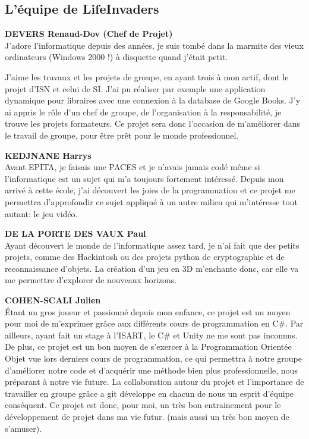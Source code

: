 \documentclass[french, 12pt]{article}
\begin{document}
\subsection{L'équipe de LifeInvaders}
\textbf{DEVERS Renaud-Dov (Chef de Projet)} \\
J'adore l'informatique depuis des années, je suis tombé dans la marmite des vieux ordinateurs (Windows 2000 !) à disquette quand j'était petit.

J'aime les travaux et les projets de groupe, en ayant trois à mon actif, dont le projet d'ISN et celui de SI. J'ai pu réaliser par exemple une application dynamique pour libraires avec une connexion à la database de Google Books.
J'y ai appris le rôle d'un chef de groupe, de l'organisation à la responsabilité, je trouve les projets formateurs.
Ce projet sera donc l'occasion de m'améliorer dans le travail de groupe, pour être prêt pour le monde professionnel.
\newline

\textbf{KEDJNANE Harrys} \\
Avant EPITA, je faisais une PACES et je n’avais jamais codé 
même si l’informatique est un sujet qui m’a toujours fortement intéressé. 
Depuis mon arrivé à cette école, j’ai découvert les joies de la programmation 
et ce projet me permettra d’approfondir ce sujet appliqué à un autre milieu 
qui m’intéresse tout autant: le jeu vidéo. 
\newline

\textbf{DE LA PORTE DES VAUX Paul} \\
Ayant découvert le monde de l’informatique assez tard, je n’ai fait que des petits projets, comme des Hackintosh ou des projets python de cryptographie et de reconnaissance d’objets.
La création d’un jeu en 3D m’enchante donc, car elle va me permettre d’explorer de nouveaux horizons.
\newline

\textbf{COHEN-SCALI Julien} \\
Étant un gros joueur et passionné depuis mon enfance, ce projet est un moyen pour moi de m’exprimer grâce aux différents cours de programmation en C\#.
Par ailleurs, ayant fait un stage à l’ISART, le C\# et Unity ne me sont pas inconnus. De plus, ce projet est un bon moyen de s’exercer à la Programmation Orientée Objet vue lors derniers cours de programmation,
ce qui permettra à notre groupe d’améliorer notre code et d’acquérir une méthode bien plus professionnelle, nous préparant à notre vie future.
La collaboration autour du projet et l’importance de travailler en groupe grâce a git développe en chacun de nous un esprit d’équipe conséquent.
Ce projet est donc, pour moi, un très bon entrainement pour le développement de projet dans ma vie futur. (mais aussi un très bon moyen de s’amuser).
\end{document}
